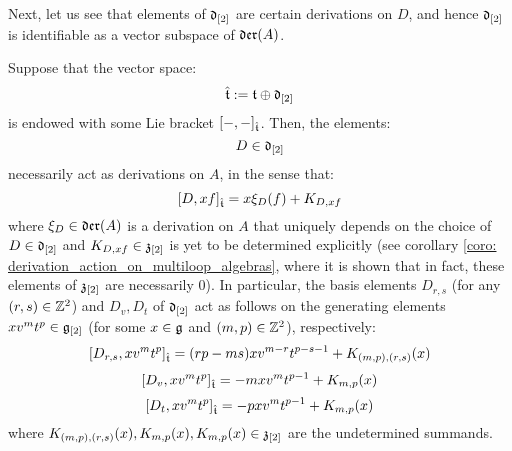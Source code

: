         Next, let us see that elements of $\mathfrak{d}_{[2]}$ are certain derivations on $D$, and hence $\mathfrak{d}_{[2]}$ is identifiable as a vector subspace of $\mathfrak{der}(A)$.
        \begin{lemma} \label{lemma: derivation_action_on_multiloop_algebras}
            Suppose that the vector space:
                $$\hat{\mathfrak{t}} := \mathfrak{t} \oplus \mathfrak{d}_{[2]}$$
            is endowed with some Lie bracket $[-, -]_{\hat{\mathfrak{t}}}$. Then, the elements:
                $$D \in \mathfrak{d}_{[2]}$$
            necessarily act as derivations on $A$, in the sense that:
                $$[D, xf]_{\hat{\mathfrak{t}}} = x \xi_D(f) + K_{D, xf}$$
            where $\xi_D \in \mathfrak{der}(A)$ is a derivation on $A$ that uniquely depends on the choice of $D \in \mathfrak{d}_{[2]}$ and $K_{D, xf} \in \mathfrak{z}_{[2]}$ is yet to be determined explicitly (see corollary \ref{coro: derivation_action_on_multiloop_algebras}, where it is shown that in fact, these elements of $\mathfrak{z}_{[2]}$ are necessarily $0$). In particular, the basis elements $D_{r, s}$ (for any $(r, s) \in \mathbb{Z}^2$) and $D_v, D_t$ of $\mathfrak{d}_{[2]}$ act as follows on the generating elements $x v^m t^p \in \mathfrak{g}_{[2]}$ (for some $x \in \mathfrak{g}$ and $(m, p) \in \mathbb{Z}^2$), respectively:
                $$[D_{r, s}, x v^m t^p]_{\hat{\mathfrak{t}}} = ( rp - ms ) x v^{m - r} t^{p - s - 1} + K_{(m, p), (r, s)}(x)$$
                $$[D_v, x v^m t^p]_{\hat{\mathfrak{t}}} = -m x v^m t^{p - 1} + K_{m, p}(x)$$
                $$[D_t, x v^m t^p]_{\hat{\mathfrak{t}}} = -p x v^m t^{p - 1} + K_{m, p}(x)$$
            where $K_{(m, p), (r, s)}(x), K_{m, p}(x), K_{m, p}(x) \in \mathfrak{z}_{[2]}$ are the undetermined summands.
        \end{lemma}
